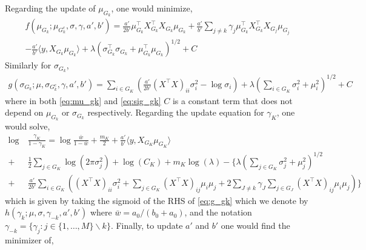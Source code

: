 Regarding the update of $\mu_{G_k}$, one would minimize,
\begin{equation} \label{eq:mu_gk}
\begin{aligned}
    f(\mu_{G_k}; \mu_{G_k^c}, \sigma, \gamma, a', b') = 
    \frac{a'}{2b'} 
    \mu_{G_k}^\top X_{G_k}^\top X_{G_k} \mu_{G_k}
+
    \frac{a'}{b'} 
    \sum_{j \neq k} 
	\gamma_j \mu_{G_k}^\top X_{G_k}^\top X_{G_j} \mu_{G_j}  \\
-
    \frac{a'}{b'}
    \langle y, X_{G_k} \mu_{G_k} \rangle
+
    \lambda \left( \sigma_{G_k}^\top \sigma_{G_k} + \mu_{G_k}^\top \mu_{G_k} \right)^{1/2} + C
\end{aligned}
\end{equation}
Similarly for $\sigma_{G_k}$,
\begin{equation} \label{eq:sig_gk}
\begin{aligned}
    g(\sigma_{G_k}; \mu, \sigma_{G_k^c}, \gamma, a', b') = 
    \sum_{i \in G_K} \left( 
    \frac{a'}{2 b'} 
	    (X^\top X)_{ii} \sigma_i^2
-
    \log{\sigma_i}
    \right )
+
    \lambda \left( \sum_{i \in G_K} 
	\sigma_i^2 + \mu_i^2
    \right)^{1/2} + C
\end{aligned}
\end{equation}
where in both \eqref{eq:mu_gk} and \eqref{eq:sig_gk} $C$ is a constant term that does not depend on $\mu_{G_k}$ or $\sigma_{G_k}$ respectively. Regarding the update equation for $\gamma_K$, one would solve,
\begin{equation} \label{eq:g_gk} 
\begin{aligned}
    \log &\ \frac{\gamma_K}{1-\gamma_K} = 
    \log \frac{\bar{w}}{1-\bar{w}}
+ 
    \frac{m_K}{2}  
+
    \frac{a'}{b'} \langle y, X_{G_K} \mu_{G_K} \rangle  \\
+ &\ 
    \frac{1}{2} \sum_{j \in G_K} \log \left( 2 \pi \sigma_j^2 \right)
+
    \log(C_K )
+
    m_K \log (\lambda)
-
\Bigg\{ 
    \lambda \left( \sum_{j \in G_K} 
	\sigma_j^2 + \mu_j^2
    \right)^{1/2}  \\
+ &\
    \frac{a'}{2b'}
    \sum_{i \in G_K} \left( 
    (X^\top X)_{ii} \sigma_i^2
    +
    \sum_{j \in G_K} 
	(X^\top X)_{ij} \mu_i \mu_j
+
    2 \sum_{J \neq k} \gamma_{J} \sum_{j \in G_J} (X^\top X)_{ij} 
	\mu_i \mu_j
    \right )
\Bigg\}
\end{aligned}
\end{equation}
which is given by taking the sigmoid of the RHS of \eqref{eq:g_gk} which we denote by $h(\gamma_k; \mu, \sigma, \gamma_{-k}, a', b')$ where $\bar{w} = a_0 / (b_0 + a_0)$, and the notation $\gamma_{-k} = \{\gamma_j : j \in \{1, \dots, M\} \backslash k \}$. Finally, to update $a'$ and $b'$ one would find the minimizer of,
